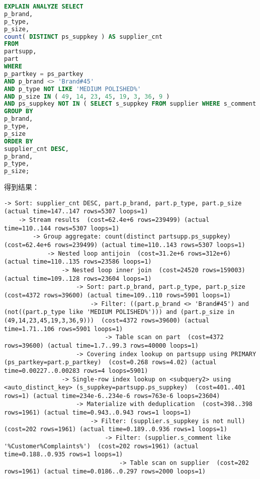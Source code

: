 \documentclass{article}
\begin{document}
\begin{lstlisting}[language=sql]
EXPLAIN ANALYZE SELECT
p_brand,
p_type,
p_size,
count( DISTINCT ps_suppkey ) AS supplier_cnt 
FROM
partsupp,
part 
WHERE
p_partkey = ps_partkey 
AND p_brand <> 'Brand#45' 
AND p_type NOT LIKE 'MEDIUM POLISHED%' 
AND p_size IN ( 49, 14, 23, 45, 19, 3, 36, 9 ) 
AND ps_suppkey NOT IN ( SELECT s_suppkey FROM supplier WHERE s_comment LIKE '%Customer%Complaints%' ) 
GROUP BY
p_brand,
p_type,
p_size 
ORDER BY
supplier_cnt DESC,
p_brand,
p_type,
p_size;
\end{lstlisting}

得到结果：

\begin{lstlisting}
-> Sort: supplier_cnt DESC, part.p_brand, part.p_type, part.p_size  (actual time=147..147 rows=5307 loops=1)
    -> Stream results  (cost=62.4e+6 rows=239499) (actual time=110..144 rows=5307 loops=1)
        -> Group aggregate: count(distinct partsupp.ps_suppkey)  (cost=62.4e+6 rows=239499) (actual time=110..143 rows=5307 loops=1)
            -> Nested loop antijoin  (cost=31.2e+6 rows=312e+6) (actual time=110..135 rows=23586 loops=1)
                -> Nested loop inner join  (cost=24520 rows=159003) (actual time=109..128 rows=23604 loops=1)
                    -> Sort: part.p_brand, part.p_type, part.p_size  (cost=4372 rows=39600) (actual time=109..110 rows=5901 loops=1)
                        -> Filter: ((part.p_brand <> 'Brand#45') and (not((part.p_type like 'MEDIUM POLISHED%'))) and (part.p_size in (49,14,23,45,19,3,36,9)))  (cost=4372 rows=39600) (actual time=1.71..106 rows=5901 loops=1)
                            -> Table scan on part  (cost=4372 rows=39600) (actual time=1.7..99.3 rows=40000 loops=1)
                    -> Covering index lookup on partsupp using PRIMARY (ps_partkey=part.p_partkey)  (cost=0.268 rows=4.02) (actual time=0.00227..0.00283 rows=4 loops=5901)
                -> Single-row index lookup on <subquery2> using <auto_distinct_key> (s_suppkey=partsupp.ps_suppkey)  (cost=401..401 rows=1) (actual time=234e-6..234e-6 rows=763e-6 loops=23604)
                    -> Materialize with deduplication  (cost=398..398 rows=1961) (actual time=0.943..0.943 rows=1 loops=1)
                        -> Filter: (supplier.s_suppkey is not null)  (cost=202 rows=1961) (actual time=0.189..0.936 rows=1 loops=1)
                            -> Filter: (supplier.s_comment like '%Customer%Complaints%')  (cost=202 rows=1961) (actual time=0.188..0.935 rows=1 loops=1)
                                -> Table scan on supplier  (cost=202 rows=1961) (actual time=0.0186..0.297 rows=2000 loops=1)
\end{lstlisting}
\end{document}
